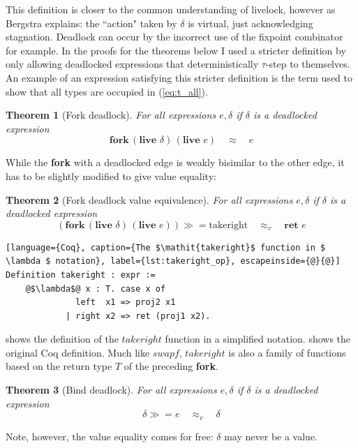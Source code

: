 \documentclass[12pt,twoside,notitlepage]{report}
\theoremstyle{plain}%
\newtheorem{thm}{Theorem}[section]
\theoremstyle{definition}
\theoremstyle{remark}
\begin{document}
This definition is closer to the common understanding of livelock, however as Bergstra\cite{bergstra1984process} explains: the ``action" taken by $ \delta $ is virtual, just acknowledging stagnation. Deadlock can occur by the incorrect use of the fixpoint combinator for example. In the proofs for the theorems below I used a stricter definition by only allowing deadlocked expressions that deterministically $ \tau $-step to themselves. An example of an expression satisfying this stricter definition is the term used to show that all types are occupied in (\ref{eq:t_all}).
\begin{thm}[Fork deadlock]
For all expressions $ e, \delta$ if $ \delta $ is a deadlocked expression
\[  \textbf{fork}\,(\textbf{live }\delta)\,(\textbf{live }e)\quad \approx \quad e \]
\end{thm}

While the \textbf{fork} with a deadlocked edge is weakly bisimilar to the other edge, it has to be slightly modified to give value equality:

\begin{thm}[Fork deadlock value equivalence]
For all expressions $ e, \delta$ if $ \delta $ is a deadlocked expression
\[  (\textbf{fork}\,(\textbf{live }\delta)\,(\textbf{live }e))\gg=\text{takeright}\quad \approx_v \quad \textbf{ret }e \]
\end{thm}

\begin{lstlisting}[language={Coq}, caption={The $\mathit{takeright}$ function in $ \lambda $ notation}, label={lst:takeright_op}, escapeinside={@}{@}]
Definition takeright : expr :=
    @$\lambda$@ x : T. case x of
              left  x1 => proj2 x1
            | right x2 => ret (proj1 x2).
\end{lstlisting}

 shows the definition of the $ \mathit{takeright} $ function in a simplified notation.  shows the original Coq definition. Much like $\mathit{swapf}$, $\mathit{takeright}$ is also a family of functions based on the return type $ T $ of the preceding \textbf{fork}.

\begin{thm}[Bind deadlock]
For all expressions $ e, \delta$ if $ \delta $ is a deadlocked expression
\[  \delta \gg= e\quad \approx_v \quad \delta \]
\end{thm}

Note, however, the value equality comes for free: $ \delta $ may never be a value.
\end{document}

